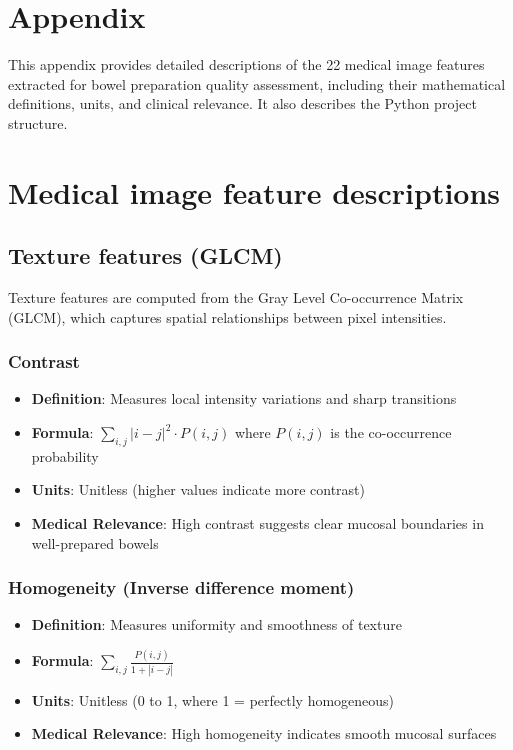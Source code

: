 \documentclass[11pt]{article}
\begin{document}
\appendix
\section{Appendix}
\label{app:appendix}

This appendix provides detailed descriptions of the 22 medical image features extracted for bowel preparation quality assessment, including their mathematical definitions, units, and clinical relevance. It also describes the Python project structure.

\section{Medical image feature descriptions}
\label{app:feature_descriptions}

\subsection{Texture features (GLCM)}

Texture features are computed from the Gray Level Co-occurrence Matrix (GLCM), which captures spatial relationships between pixel intensities.

\subsubsection{Contrast}
\begin{itemize}
    \item \textbf{Definition}: Measures local intensity variations and sharp transitions
    \item \textbf{Formula}: $\displaystyle \sum_{i,j} |i-j|^2 \cdot P(i,j)$ where $P(i,j)$ is the co-occurrence probability
    \item \textbf{Units}: Unitless (higher values indicate more contrast)
    \item \textbf{Medical Relevance}: High contrast suggests clear mucosal boundaries in well-prepared bowels
\end{itemize}

\subsubsection{Homogeneity (Inverse difference moment)}
\begin{itemize}
    \item \textbf{Definition}: Measures uniformity and smoothness of texture
    \item \textbf{Formula}: $\displaystyle \sum_{i,j} \frac{P(i,j)}{1 + |i-j|}$
    \item \textbf{Units}: Unitless (0 to 1, where 1 = perfectly homogeneous)
    \item \textbf{Medical Relevance}: High homogeneity indicates smooth mucosal surfaces
\end{itemize}
\end{document}
